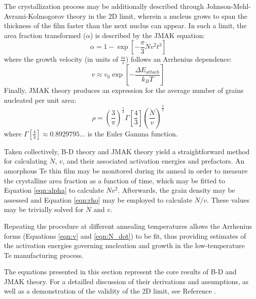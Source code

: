 The crystallization process may be additionally described through Johnson-Mehl-Avrami-Kolmogorov theory in the 2D limit, wherein a nucleus grows to span the thickness of the film faster than the next nuclus can appear.  In such a limit, the area fraction transformed ($\alpha$) is described by the JMAK equation:
%
	\begin{equation}
		\alpha = 1 - \exp
		\left[ -\frac{\pi}{3}\dot{N}v^2t^3 \right]
	\label{eqn:alpha}
	\end{equation}
%
where the growth velocity (in units of $\frac{m}{s}$) follows an Arrhenius dependence:
%
	\begin{equation}
		v \approx v_0 \exp \left[ - \frac{\Delta E_{attach}}{k_B T} \right]
	\label{eqn:v}
	\end{equation}
%
Finally, JMAK theory produces an expression for the average number of grains nucleated per unit area:
%
	\begin{equation}
		\rho = \left(\frac{3}{\pi}\right)^{\frac{1}{3}}
		\Gamma \left[ \frac{4}{3} \right]
		\left( \frac{\dot{N}}{v} \right)^{\frac{2}{3}}
	\label{eqn:rho}
	\end{equation}
%
where $\Gamma \left[ \frac{4}{3} \right] \approx 0.8929795...$ is the Euler Gamma function.

Taken collectively, B-D theory and JMAK theory yield a straightforward method for calculating $\dot{N}$, $v$, and their associated activation energies and prefactors.  An amorphous Te thin film may be monitored during its anneal in order to measure the crystalline area fraction as a function of time, which may be fitted to Equation \ref{eqn:alpha} to calculate $\dot{N}v^2$.  Afterwards, the grain density may be assessed and Equation \ref{eqn:rho} may be employed to calculate $\dot{N}/v$.  These values may be trivially solved for $\dot{N}$ and ${v}$.

Repeating the procedure at different annealing temperatures allows the Arrhenius forms (Equations \ref{eqn:v} and \ref{eqn:N_dot}) to be fit, thus providing estimates of the activation energies governing nucleation and growth in the low-temperature Te manufacturing process.

The equations presented in this section represent the core results of B-D and JMAK theory.  For a detailled discussion of their derivations and assumptions, as well as a demonstration of the validity of the 2D limit, see Reference \cite{chrzan:2020}.
